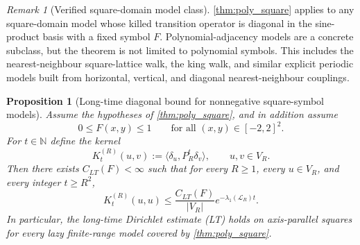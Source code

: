 \documentclass[reqno]{amsart}
\numberwithin{equation}{section}
\newtheorem{proposition}[proposition]{Proposition}
\theoremstyle{definition}
\theoremstyle{remark}
\newtheorem{remark}[remark]{Remark}
\newcommand{\Cref}[1]{\autoref{#1}}
\begin{document}
\begin{remark}[Verified square-domain model class]\label{rem:poly_square_class}
\Cref{thm:poly_square} applies to any square-domain model whose killed transition operator is diagonal in the sine-product basis with a fixed symbol $F$. Polynomial-adjacency models are a concrete subclass, but the theorem is not limited to polynomial symbols. This includes the nearest-neighbour square-lattice walk, the king walk, and similar explicit periodic models built from horizontal, vertical, and diagonal nearest-neighbour couplings.
\end{remark}

\begin{proposition}[Long-time diagonal bound for nonnegative square-symbol models]\label{prop:poly_square_LT}
Assume the hypotheses of \Cref{thm:poly_square}, and in addition assume
\[
  0\le F(x,y)\le 1
  \qquad\text{for all }(x,y)\in[-2,2]^2.
\]
For $t\in\mathbb N$ define the kernel
\[
  K_t^{(R)}(u,v):=\langle \delta_u, P_R^t\delta_v\rangle,
  \qquad u,v\in V_R.
\]
Then there exists $C_{LT}(F)<\infty$ such that for every $R\ge1$, every $u\in V_R$, and every integer $t\ge R^2$,
\[
  K_t^{(R)}(u,u)
  \le
  \frac{C_{LT}(F)}{|V_R|}e^{-\lambda_1(\mathcal L_R)t}.
\]
In particular, the long-time Dirichlet estimate \textup{(LT)} holds on axis-parallel squares for every lazy finite-range model covered by \Cref{thm:poly_square}.
\end{proposition}
\end{document}
